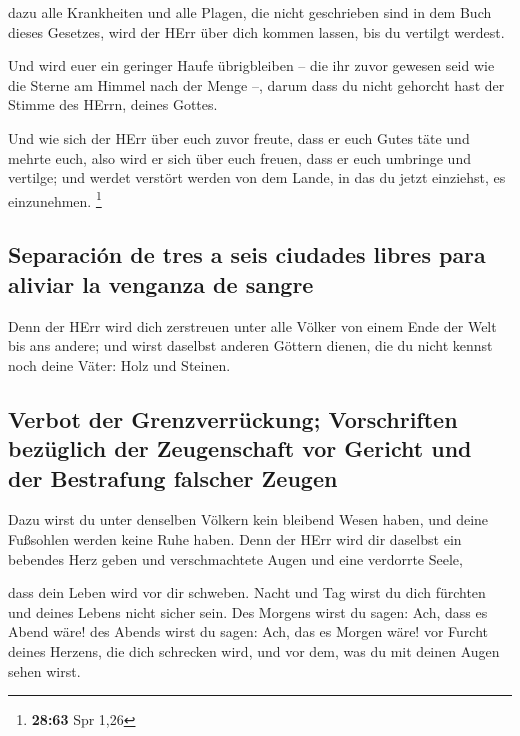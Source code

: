  dazu alle Krankheiten und alle Plagen, die nicht
geschrieben sind in dem Buch dieses Gesetzes, wird der HErr über dich
kommen lassen, bis du vertilgt werdest.

 Und wird euer ein geringer Haufe übrigbleiben -- die ihr
zuvor gewesen seid wie die Sterne am Himmel nach der Menge --, darum
dass du nicht gehorcht hast der Stimme des HErrn, deines Gottes.

 Und wie sich der HErr über euch zuvor freute, dass er
euch Gutes täte und mehrte euch, also wird er sich über euch freuen,
dass er euch umbringe und vertilge; und werdet verstört werden von dem
Lande, in das du jetzt einziehst, es einzunehmen. \footnote{\textbf{28:63}
  Spr 1,26}

\hypertarget{separaciuxf3n-de-tres-a-seis-ciudades-libres-para-aliviar-la-venganza-de-sangre}{%
\subsection{Separación de tres a seis ciudades libres para aliviar la
venganza de
sangre}\label{separaciuxf3n-de-tres-a-seis-ciudades-libres-para-aliviar-la-venganza-de-sangre}}

 Denn der HErr wird dich zerstreuen unter alle Völker von
einem Ende der Welt bis ans andere; und wirst daselbst anderen Göttern
dienen, die du nicht kennst noch deine Väter: Holz und Steinen.

\hypertarget{verbot-der-grenzverruxfcckung-vorschriften-bezuxfcglich-der-zeugenschaft-vor-gericht-und-der-bestrafung-falscher-zeugen}{%
\subsection{Verbot der Grenzverrückung; Vorschriften bezüglich der
Zeugenschaft vor Gericht und der Bestrafung falscher
Zeugen}\label{verbot-der-grenzverruxfcckung-vorschriften-bezuxfcglich-der-zeugenschaft-vor-gericht-und-der-bestrafung-falscher-zeugen}}

 Dazu wirst du unter denselben Völkern kein bleibend
Wesen haben, und deine Fußsohlen werden keine Ruhe haben. Denn der HErr
wird dir daselbst ein bebendes Herz geben und verschmachtete Augen und
eine verdorrte Seele,

 dass dein Leben wird vor dir schweben. Nacht und Tag
wirst du dich fürchten und deines Lebens nicht sicher sein.
 Des Morgens wirst du sagen: Ach, dass es Abend wäre! des
Abends wirst du sagen: Ach, das es Morgen wäre! vor Furcht deines
Herzens, die dich schrecken wird, und vor dem, was du mit deinen Augen
sehen wirst.

